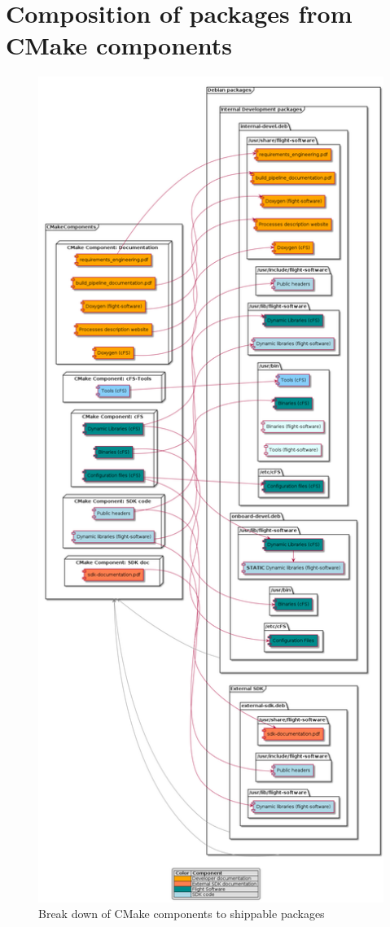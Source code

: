 \section{Composition of packages from CMake components}
\begin{figure}[H]
    \centering
    \includegraphics[width=\textwidth,height=\textheight,keepaspectratio]{diagrams/artefact_generation.png}
    \caption{Break down of CMake components to shippable packages}
    \label{fig-cmake-components-to-packages}
\end{figure}
